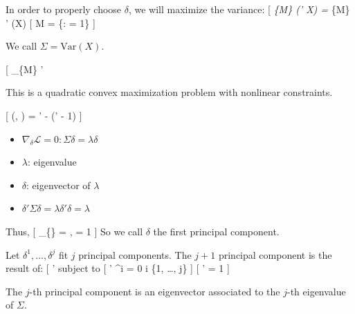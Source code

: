 In order to properly choose \(\delta\), we will maximize the variance:
{[} \max\emph{\{\delta \in M\} (\delta' X) =
\max}\{\delta \in M\} \delta' (X) \delta  {]} {[} M =
\{\delta : \textbar{}\delta\textbar{} = 1\} {]}

We call \(\Sigma = \text{Var}(X)\).

{[} \max\_\{\delta \in M\} \delta' \Sigma \delta  {]}

This is a quadratic convex maximization problem with nonlinear
constraints.

{[}  (\delta, \lambda) = \delta' \Sigma \delta -
\lambda (\delta' \delta - 1) {]}

\begin{itemize}
\item
  \(\nabla_{\delta} \mathcal{L} = 0 : \Sigma \delta = \lambda \delta\)
\item
  \(\lambda\): eigenvalue
\item
  \(\delta\): eigenvector of \(\lambda\)
\item
  \(\delta' \Sigma \delta = \lambda \delta' \delta = \lambda\)
\end{itemize}

Thus, {[} \max\_\{\delta\} \lambda \quad {}
\quad \Sigma \delta = \lambda \delta, \textbar{}\delta\textbar{} = 1 {]}
So we call \(\delta\) the first principal component.

Let \(\delta^1, \ldots, \delta^j\) fit \(j\) principal components. The
\(j+1\) principal component is the result of: {[} \max \delta'
\Sigma \delta  {]} subject to {[} \delta' \delta\^{}i = 0
\quad \forall i \in \{1, \ldots, j\} {]} {[} \delta' \delta = 1 {]}

The \(j\)-th principal component is an eigenvector associated to the
\(j\)-th eigenvalue of \(\Sigma\).

